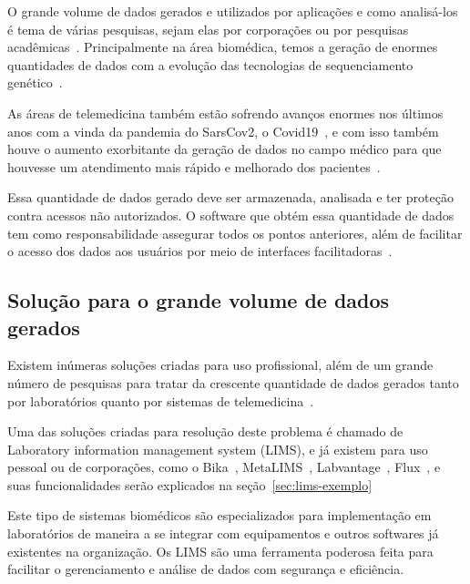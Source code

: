 
O grande volume de dados gerados e utilizados por aplicações e como analisá-los é tema de várias pesquisas, sejam elas por corporações ou por pesquisas acadêmicas~\cite{PhilipChen2014Data-intensiveData}. Principalmente na área biomédica, temos a geração de enormes quantidades de dados com a evolução das tecnologias de sequenciamento genético~\cite{luoJ2016}.

As áreas de telemedicina também estão sofrendo avanços enormes nos últimos anos com a vinda da pandemia do SarsCov2, o Covid19~\cite{bakhtiar2020, kronenfeld2021, GatesB.Colbert2020UtilityEra}, e com isso também houve o aumento exorbitante da geração de dados no campo médico para que houvesse um atendimento mais rápido e melhorado dos pacientes~\cite{MohdKhanapiAbdGhani2018PDFData, Coakley2015TransformingAnalytics}.

Essa quantidade de dados gerado deve ser armazenada, analisada e ter proteção contra acessos não autorizados. O software que obtém essa quantidade de dados tem como responsabilidade assegurar todos os pontos anteriores, além de facilitar o acesso dos dados aos usuários por meio de interfaces facilitadoras~\cite{Nolan1998UnderstandingSystems}.

\subsection{Solução para o grande volume de dados gerados}

Existem inúmeras soluções criadas para uso profissional, além de um grande número de pesquisas para tratar da crescente quantidade de dados gerados tanto por laboratórios quanto por sistemas de telemedicina~\cite{Mangrulkar2022AutomaticTechniques}.

Uma das soluções criadas para resolução deste problema é chamado de Laboratory information management system (LIMS), e já existem para uso pessoal ou de corporações, como o Bika~\cite{Goodblatt2006FosteringProcess}, MetaLIMS~\cite{Heinle2017MetaLIMSLabs}, Labvantage~\cite{Smallmon2017BiobankingSilos}, Flux~\cite{Melo2010SIGLa:Laboratories}, e suas funcionalidades serão explicados na seção~\ref{sec:lims-exemplo}

Este tipo de sistemas biomédicos são especializados para implementação em laboratórios de maneira a se integrar com equipamentos e outros softwares já existentes na organização.
Os LIMS são uma ferramenta poderosa feita para facilitar o gerenciamento e análise de dados com segurança e eficiência.



